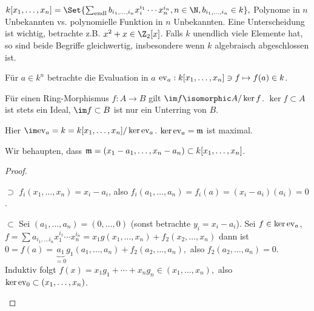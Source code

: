 \begin{nt}
    \begin{math}
        k[x_1, \dotsc, x_n] = \Set{\sum_{\text{endl}} b_{i_1, \dotsc, i_n} x_i^{i_1} \dotsb x_n^{i_n}, n \in \N, b_{i_1, \dotsc, i_n} \in k},
    \end{math}
    Polynome in $n$ Unbekannten vs. polynomielle Funktion in $n$ Unbekannten.
    Eine Unterscheidung ist wichtig, betrachte z.B. $x^2 + x \in \Z_2[x]$.
    Falls $k$ unendlich viele Elemente hat, so sind beide Begriffe gleichwertig, insbesondere wenn $k$ algebraisch abgeschlossen ist.
\end{nt}

\begin{ex}
    Für $a \in k^n$ betrachte die Evaluation in $a$ $\ev_a: k[x_1, \dotsc, x_n] \ni f \mapsto f(a) \in k$.

    Für einen Ring-Morphismus $f: A \to B$ gilt $\im f \isomorphic A / \ker f$.
    $\ker f \subset A$ ist stets ein Ideal, $\im f \subset B$ ist nur ein Unterring von $B$.

    Hier $\im \ev_a = k = k[x_1, \dotsc, x_n] / \ker \ev_a$.
    $\ker \ev_a = \frak m$ ist maximal.

    Wir behaupten, dass $\frak m = (x_1 - a_1, \dotsc, x_n - a_n) \subset k[x_1, \dotsc, x_n]$.
    \begin{proof}
        \begin{segnb}{$\supset$}
            $f_i(x_1, \dotsc, x_n) = x_i - a_i$, also $f_i(a_1, \dotsc, a_n) = f_i(a) = (x_i - a_i)(a_i) = 0$.
        \end{segnb}
        \begin{segnb}{$\subset$}
            Sei $(a_1, \dotsc, a_n) = (0, \dotsc, 0)$ (sonst betrachte $y_i = x_i - a_i$).
            Sei $f \in \ker \ev_a$, $f = \sum a_{i_1, \dotsc i_n} x_1^{i_1} \dotsb x_n^{i_n} = x_1 g(x_1, \dotsc, x_n) + f_2(x_2, \dotsc, x_n)$ dann ist
            \begin{math}
                0 = f(a) = \underbrace{a_1}_{=0} g_1(a_1, \dotsc, a_n) + f_2(a_2, \dotsc, a_n),
            \end{math}
            also $f_2(a_2, \dotsc, a_n) = 0$.
            Induktiv folgt
            \begin{math}
                f(x) = x_1 g_1 + \dotsb + x_n g_n \in (x_1, \dotsc, x_n),
            \end{math}
            also $\ker \ev_0 \subset (x_1, \dotsc, x_n)$.
        \end{segnb}
    \end{proof}


\end{ex}
